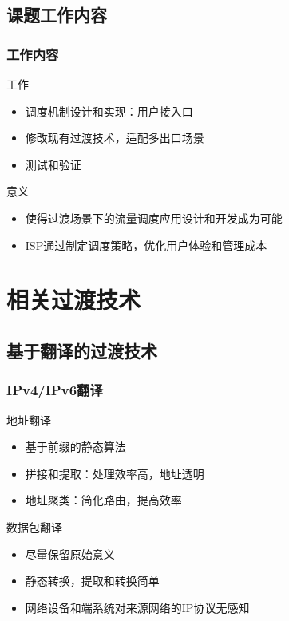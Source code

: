 \documentclass{beamer}
\begin{document}
\subsection{课题工作内容}
\begin{frame}
  \frametitle{工作内容}

  \begin{block}{工作}
    \begin{itemize}
    \item 调度机制设计和实现：用户接入口
    \item 修改现有过渡技术，适配多出口场景
    \item 测试和验证
    \end{itemize}
  \end{block}

  \begin{block}{意义}
    \begin{itemize}
    \item 使得过渡场景下的流量调度应用设计和开发成为可能
    \item ISP通过制定调度策略，优化用户体验和管理成本
    \end{itemize}
  \end{block}
\end{frame}

\section{相关过渡技术}
\subsection{基于翻译的过渡技术}
\begin{frame}
  \frametitle{IPv4/IPv6翻译}

  \begin{block}{地址翻译}
    \begin{itemize}
    \item 基于前缀的静态算法
    \item 拼接和提取：处理效率高，地址透明
    \item 地址聚类：简化路由，提高效率
    \end{itemize}
  \end{block}

  \begin{block}{数据包翻译}
    \begin{itemize}
    \item 尽量保留原始意义
    \item 静态转换，提取和转换简单
    \item 网络设备和端系统对来源网络的IP协议无感知
    \end{itemize}
  \end{block}
\end{frame}
\end{document}
